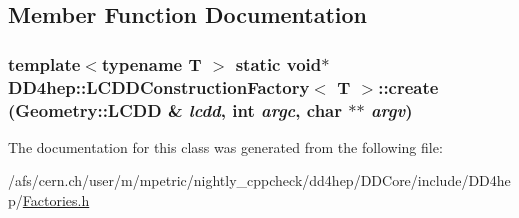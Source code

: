 \subsection{Member Function Documentation}
\hypertarget{class_d_d4hep_1_1_l_c_d_d_construction_factory_aa6fda027eb3dbfc490d9daad93ea18a0}{
\subsubsection[{create}]{\setlength{\rightskip}{0pt plus 5cm}template$<$typename T $>$ static void$\ast$ {\bf DD4hep::LCDDConstructionFactory}$<$ {\bf T} $>$::create ({\bf Geometry::LCDD} \& {\em lcdd}, \/  int {\em argc}, \/  char $\ast$$\ast$ {\em argv})}}
\label{class_d_d4hep_1_1_l_c_d_d_construction_factory_aa6fda027eb3dbfc490d9daad93ea18a0}


The documentation for this class was generated from the following file:\begin{DoxyCompactItemize}
\item 
/afs/cern.ch/user/m/mpetric/nightly\_\-cppcheck/dd4hep/DDCore/include/DD4hep/\hyperlink{_d_d_core_2include_2_d_d4hep_2_factories_8h}{Factories.h}\end{DoxyCompactItemize}

